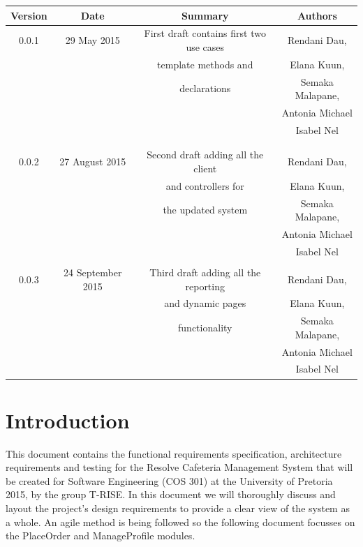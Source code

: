 \documentclass[a4paper,12pt]{report}
\begin{document}
\begin{table}[h!]
\centering
 \begin{tabular}{||c c c c||} 
 \hline
 \textbf{Version} & \textbf{Date} & \textbf{Summary} & \textbf{Authors} \\ [0.5ex] 
 \hline\hline
 0.0.1 & 29 May 2015 &  First draft contains first two use cases  & Rendani Dau, \\ & & template methods and  & Elana Kuun, \\ & &  declarations& Semaka Malapane, \\ & & & Antonia Michael \\ & & & Isabel Nel \\ & & & \\
 \hline 
 & & & \\
 0.0.2 & 27 August 2015 &  Second draft adding all the client & Rendani Dau, \\ & & and controllers for & Elana Kuun, \\ & & the updated system & Semaka Malapane, \\ & & &  Antonia Michael \\ & & & Isabel Nel \\   [1ex] 
 \hline 
 & & & \\
 0.0.3 & 24 September 2015 &  Third draft adding all the reporting & Rendani Dau, \\ & & and dynamic pages & Elana Kuun, \\ & &  functionality  & Semaka Malapane, \\ & & &  Antonia Michael \\ & & & Isabel Nel \\   [1ex] 
 \hline  
 \end{tabular}
\end{table}

\pagebreak



\section{Introduction}
This document contains the functional requirements specification, architecture requirements and testing for the Resolve Cafeteria Management System that will be created for Software Engineering (COS 301) at the University of Pretoria 2015, by the group T-RISE. In this document we will thoroughly discuss and layout the project's design requirements to provide a clear view of the system as a whole. An agile method is being followed so the following document focusses on the PlaceOrder and ManageProfile modules.
\end{document}
